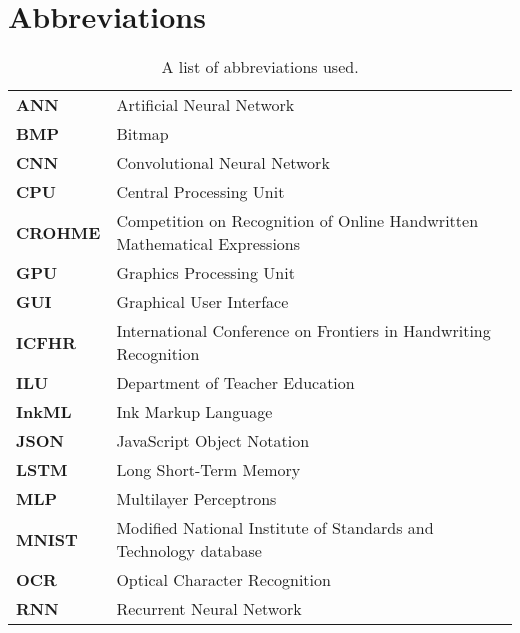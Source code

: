 \section{Abbreviations}  %
\begin{table}[H]
\begin{tabular}{ l l }
\textbf{ANN} & Artificial Neural Network \\
\textbf{BMP} & Bitmap \\
\textbf{CNN} & Convolutional Neural Network \\
\textbf{CPU} & Central Processing Unit \\
\textbf{CROHME} & Competition on Recognition of Online Handwritten Mathematical Expressions\\
\textbf{GPU} & Graphics Processing Unit \\
\textbf{GUI} & Graphical User Interface \\
\textbf{ICFHR} & International Conference on Frontiers in Handwriting Recognition \\
\textbf{ILU} & Department of Teacher Education \\
\textbf{InkML} & Ink Markup Language \\
\textbf{JSON} & JavaScript Object Notation \\
\textbf{LSTM} & Long Short-Term Memory \\
\textbf{MLP} & Multilayer Perceptrons \\
\textbf{MNIST} & Modified National Institute of Standards and Technology database \\
\textbf{OCR} & Optical Character Recognition \\
\textbf{RNN} & Recurrent Neural Network \\
\end{tabular}
\label{table:abbreviations}
\caption{A list of abbreviations used.}
\end{table}
